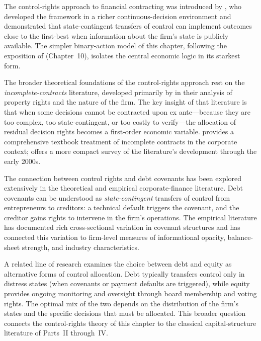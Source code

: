 \documentclass[11pt,a4paper,oneside]{book}
\theoremstyle{plain}
\theoremstyle{definition}
\theoremstyle{remark}
\numberwithin{equation}{chapter}
\begin{document}
The control-rights approach to financial contracting was introduced by \citet{AghionBolton1992}, who developed the framework in a richer continuous-decision environment and demonstrated that state-contingent transfers of control can implement outcomes close to the first-best when information about the firm's state is publicly available.
The simpler binary-action model of this chapter, following the exposition of \citet{Tirole2006} (Chapter~10), isolates the central economic logic in its starkest form.

The broader theoretical foundations of the control-rights approach rest on the \emph{incomplete-contracts} literature, developed primarily by \citet{HartMoore1990} in their analysis of property rights and the nature of the firm.
The key insight of that literature is that when some decisions cannot be contracted upon ex ante---because they are too complex, too state-contingent, or too costly to verify---the allocation of residual decision rights becomes a first-order economic variable.
\citet{Hart1995} provides a comprehensive textbook treatment of incomplete contracts in the corporate context; \citet{Hart2001} offers a more compact survey of the literature's development through the early 2000s.

The connection between control rights and debt covenants has been explored extensively in the theoretical and empirical corporate-finance literature.
Debt covenants can be understood as \emph{state-contingent} transfers of control from entrepreneurs to creditors: a technical default triggers the covenant, and the creditor gains rights to intervene in the firm's operations.
The empirical literature has documented rich cross-sectional variation in covenant structures and has connected this variation to firm-level measures of informational opacity, balance-sheet strength, and industry characteristics.

A related line of research examines the choice between debt and equity as alternative forms of control allocation.
Debt typically transfers control only in distress states (when covenants or payment defaults are triggered), while equity provides ongoing monitoring and oversight through board membership and voting rights.
The optimal mix of the two depends on the distribution of the firm's states and the specific decisions that must be allocated.
This broader question connects the control-rights theory of this chapter to the classical capital-structure literature of Parts~II through~IV.

\backmatter


\end{document}
